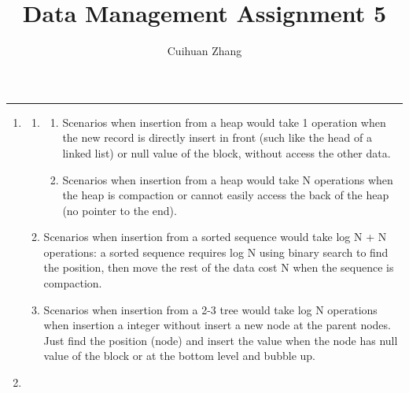 \documentclass[12pt]{extarticle}
\title{Data Management Assignment 5}
\author{Cuihuan Zhang}
\begin{document}
\maketitle \vspace{-10mm}
\rule{\linewidth}{0.4pt}


\begin{flushleft}
\begin{enumerate}

\item

\begin{enumerate}

\item

\begin{enumerate}
\item Scenarios when insertion from a heap would take 1 operation when the new record is directly insert in front (such like the head of a linked list) or null value of the block, without access the other data.
\item Scenarios when insertion from a heap would take N operations when the heap is compaction or cannot easily access the back of the heap (no pointer to the end).
\end{enumerate}

\item Scenarios when insertion from a sorted sequence would take log N + N operations: a sorted sequence requires log N using binary search to find the position, then move the rest of the data cost N when the sequence is compaction.

\item Scenarios when insertion from a 2-3 tree would take log N operations when insertion a integer without insert a new node at the parent nodes. Just find the position (node) and insert the value when the node has null value of the block or at the bottom level and bubble up.
\end{enumerate}

\item
\begin{enumerate}


\end{enumerate}
\end{enumerate}
\end{flushleft}
\end{document}
